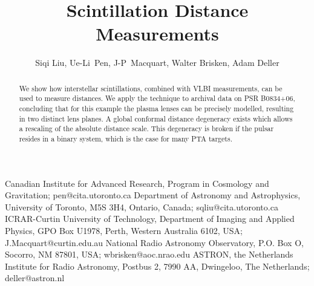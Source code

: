 \documentclass{emulateapj}
\begin{document}
\title[Lensing Distance]{
Scintillation Distance Measurements
}


\author{Siqi Liu, Ue-Li~Pen, J-P~Macquart, Walter Brisken, Adam Deller}
 {Canadian Institute for Advanced Research, Program in Cosmology and Gravitation; pen@cita.utoronto.ca}
 {Department of Astronomy and Astrophysics, University of Toronto, M5S 3H4, Ontario, Canada; sqliu@cita.utoronto.ca}
 {ICRAR-Curtin University of Technology, Department of Imaging and Applied Physics, GPO Box U1978, Perth, Western Australia 6102, USA; J.Macquart@curtin.edu.au}
 {National Radio Astronomy Observatory, P.O. Box O, Socorro, NM 87801, USA; wbrisken@aoc.nrao.edu}
 {ASTRON, the Netherlands Institute for Radio Astronomy, Postbus 2, 7990 AA, Dwingeloo, The Netherlands; deller@astron.nl}





\begin{abstract}
We show how interstellar scintillations, combined with VLBI
measurements, can be used to measure distances.  
We apply the technique to archival data on PSR
B0834+06, concluding that for this example the plasma lenses can be
precisely modelled, resulting in two distinct lens planes.  A global
conformal distance degeneracy exists which allows a rescaling of the
absolute distance scale.  This degeneracy is broken if the pulsar resides in a
binary system, which is the case for many PTA targets.
\end{abstract}
\end{document}
